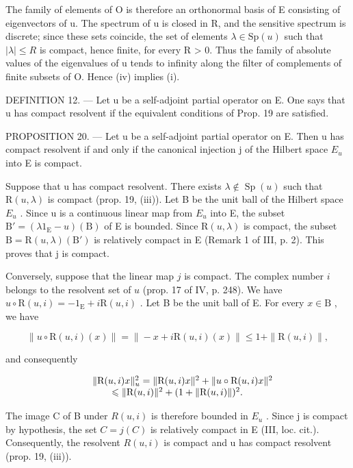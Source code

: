The family of elements of O is therefore an orthonormal basis of E consisting of eigenvectors of u. The spectrum of u is closed in R, and the sensitive spectrum is discrete; since these sets coincide, the set of elements \(\lambda \in \mathrm{Sp}(u)\) such that \(|\lambda| \leqslant R\) is compact, hence finite, for every R > 0. Thus the family of absolute values of the eigenvalues of u tends to infinity along the filter of complements of finite subsets of O. Hence (iv) implies (i).

DEFINITION 12. --- Let u be a self-adjoint partial operator on E. One says that u has compact resolvent if the equivalent conditions of Prop. 19 are satisfied.

PROPOSITION 20. --- Let u be a self-adjoint partial operator on E. Then u has compact resolvent if and only if the canonical injection j of the Hilbert space \(E_{u}\) into E is compact.

Suppose that u has compact resolvent. There exists \(\lambda \notin \operatorname{Sp}(u)\) such that \(\mathrm{R}(u, \lambda)\) is compact (prop. 19, (iii)). Let B be the unit ball of the Hilbert space \(E_{u}\) . Since u is a continuous linear map from \(E_{u}\) into E, the subset \(\mathrm{B}' = (\lambda 1_{\mathrm{E}} - u)(\mathrm{B})\) of E is bounded. Since \(\mathrm{R}(u, \lambda)\) is compact, the subset \(\mathrm{B} = \mathrm{R}(u, \lambda)(\mathrm{B}')\) is relatively compact in E (Remark 1 of III, p. 2). This proves that j is compact.

Conversely, suppose that the linear map \(j\) is compact. The complex number \(i\) belongs to the resolvent set of \(u\) (prop. 17 of IV, p. 248). We have \(u \circ \mathrm{R}(u, i) = -1_{\mathrm{E}} + i\mathrm{R}(u, i)\) . Let B be the unit ball of E. For every \(x \in \mathrm{B}\) , we have

\[
\| u \circ \mathrm{R} (u, i) (x) \| = \| - x + i \mathrm{R} (u, i) (x) \| \leqslant 1 + \| \mathrm{R} (u, i) \|,
\]

and consequently

\[
\begin{array}{r l} & {\| \mathrm{R} (u, i) x \| _ {u} ^ {2} = \| \mathrm{R} (u, i) x \| ^ {2} + \| u \circ \mathrm{R} (u, i) x \| ^ {2}} \\ & {\qquad \leqslant \| \mathrm{R} (u, i) \| ^ {2} + (1 + \| \mathrm{R} (u, i) \|) ^ {2}.} \end{array}
\]

The image C of B under \(R(u,i)\) is therefore bounded in \(E_{u}\) . Since j is compact by hypothesis, the set \(C = j(C)\) is relatively compact in E (III, loc. cit.). Consequently, the resolvent \(R(u,i)\) is compact and u has compact resolvent (prop. 19, (iii)).

